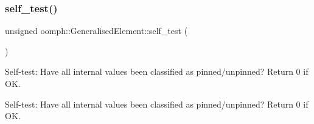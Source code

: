 \mbox{\label{classoomph_1_1GeneralisedElement_ab6bf086bf8268c53ea588e4e52c47cec}} 
\subsubsection{\texorpdfstring{self\+\_\+test()}{self\_test()}}
{\footnotesize\ttfamily unsigned oomph\+::\+Generalised\+Element\+::self\+\_\+test (\begin{DoxyParamCaption}{ }\end{DoxyParamCaption})\hspace{0.3cm}{\ttfamily [virtual]}}



Self-\/test\+: Have all internal values been classified as pinned/unpinned? Return 0 if OK. 

Self-\/test\+: Have all internal values been classified as pinned/unpinned? Return 0 if OK. 


